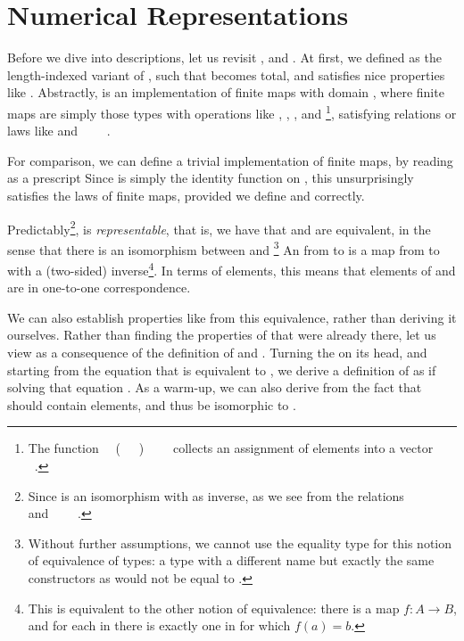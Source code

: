 \section{Numerical Representations}\label{sec:desc-numrep}
Before we dive into descriptions, let us revisit \bN{},  and . At first, we defined  as the length-indexed variant of , such that  becomes total, and satisfies nice properties like . Abstractly,  is an implementation of finite maps with domain , where finite maps are simply those types with operations like , , , and \footnote{The function \ \AV{:}\ (\ \ \ )\ \ \ \  collects an assignment of elements  into a vector \ .}, satisfying relations or laws like  and \ \ \ \ . 

For comparison, we can define a trivial implementation of finite maps, by reading  as a prescript
Since  is simply the identity function on , this unsurprisingly satisfies the laws of finite maps, provided we define  and  correctly.

Predictably\footnote{Since  is an isomorphism with  as inverse, as we see from the relations \ \ \ \  and  \ \ \ \ .},  is \emph{representable}, that is, we have that  and  are equivalent, in the sense that there is an isomorphism between  and \footnote{Without further assumptions, we cannot use the equality type  for this notion of equivalence of types: a type with a different name but exactly the same constructors as  would not be equal to .}
An  from  to  is a map from  to  with a (two-sided) inverse\footnote{This is equivalent to the other notion of equivalence: there is a map $f : A \to B$, and for each  in  there is exactly one  in  for which $f(a) = b$.}. In terms of elements, this means that elements of  and  are in one-to-one correspondence.

We can also establish properties like  from this equivalence, rather than deriving it ourselves. Rather than finding the properties of  that were already there, let us view  as a consequence of the definition of \bN{} and . Turning the  on its head, and starting from the equation that  is equivalent to , we derive a definition of  as if solving that equation \cite{calcdata}. As a warm-up, we can also derive  from the fact that \  should contain  elements, and thus be isomorphic to .

